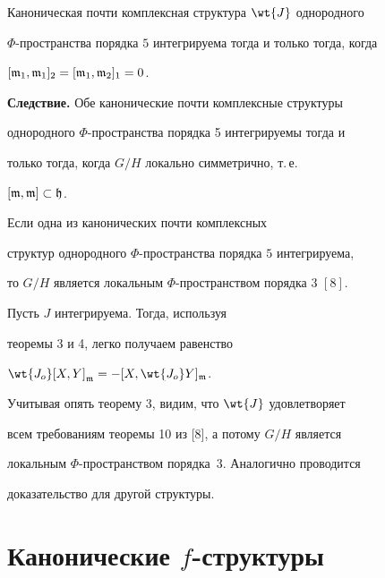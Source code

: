 \begin{thm}


Каноническая почти комплексная структура $\wt{J}$ однородного


$\Phi$-пространства порядка $5$ интегрируема тогда и только тогда, когда


$[\frak{m}_1,\frak{m}_1]_2=[\frak{m}_1,\frak{m}_2]_1=0$.


\end{thm}





{\bf Следствие.} Обе канонические почти комплексные структуры


однородного $\Phi$-пространства порядка 5 интегрируемы тогда и


только тогда, когда $G/H$ локально симметрично, т.\,е.


$[\frak{m},\frak{m}]\subset \frak{h}$.





\begin{thm}


Если одна из канонических почти комплексных


структур однородного $\Phi$-прост\-ран\-ст\-ва порядка $5$ интегрируема,


то $G/H$ является локальным $\Phi$-пространством порядка $3$ $[8]$.


\end{thm}





\begin{pf}


Пусть $J$ интегрируема. Тогда, используя


теоремы 3 и 4, легко получаем равенство


$\wt{J_o}[X,Y]_{\frak{m}}=-[X, \wt{J_o}Y]_{\frak{m}}$.


Учитывая опять теорему 3, видим, что $ \wt{J}$ удовлетворяет


всем требованиям теоремы 10 из [8], а потому $G/H$ является


локальным $\Phi$-пространством порядка~3. Аналогично проводится


доказательство для другой структуры.


\end{pf}





\section{Канонические $f$-структуры}





